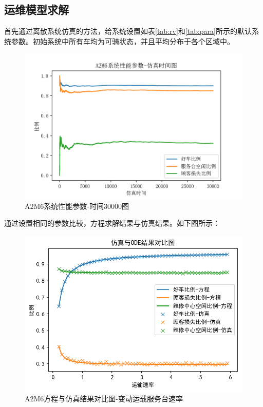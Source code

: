 \documentclass{article}
\begin{document}
\subsection{运维模型求解}
首先通过离散系统仿真的方法，给系统设置如表\ref{tab:rv}和\ref{tab:para}所示的默认系统参数。初始系统中所有车均为可骑状态，并且平均分布于各个区域中。
\begin{figure}[H]
    \centering
    \includegraphics[scale=0.5]{sim/sim_timeA2M6.png}
    \caption{A2M6系统性能参数-时间30000图}
    \label{fig:cenmodel}
\end{figure}
通过设置相同的参数比较，方程求解结果与仿真结果。如下图所示：
\begin{figure}[H]
    \centering
    \includegraphics[scale=0.5]{A2M6仿真-odeSingle.png}
    \caption{A2M6方程与仿真结果对比图-变动运载服务台速率}
    \label{fig:cenmodel}
\end{figure}
\end{document}
